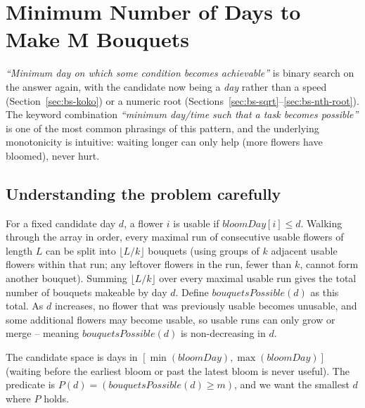 \section{Minimum Number of Days to Make M Bouquets}
\label{sec:bs-bouquets}


\begin{patternbox}
\emph{``Minimum day on which some condition becomes achievable''} is
binary search on the answer again, with the candidate now being a
\emph{day} rather than a speed (Section~\ref{sec:bs-koko}) or a numeric
root (Sections~\ref{sec:bs-sqrt}--\ref{sec:bs-nth-root}). The keyword
combination \emph{``minimum day/time such that a task becomes possible''}
is one of the most common phrasings of this pattern, and the underlying
monotonicity is intuitive: waiting longer can only help (more flowers have
bloomed), never hurt.
\end{patternbox}

\subsection*{Understanding the problem carefully}

For a fixed candidate day $d$, a flower $i$ is usable if
$\textit{bloomDay}[i] \le d$. Walking through the array in order, every
maximal run of consecutive usable flowers of length $L$ can be split into
$\lfloor L/k \rfloor$ bouquets (using groups of $k$ adjacent usable flowers
within that run; any leftover flowers in the run, fewer than $k$, cannot
form another bouquet). Summing $\lfloor L/k \rfloor$ over every maximal
usable run gives the total number of bouquets makeable by day $d$. Define
$\textit{bouquetsPossible}(d)$ as this total. As $d$ increases, no flower
that was previously usable becomes unusable, and some additional flowers
may become usable, so usable runs can only grow or merge -- meaning
$\textit{bouquetsPossible}(d)$ is non-decreasing in $d$.

\begin{ideabox}
The candidate space is days in $[\min(\textit{bloomDay}),
\max(\textit{bloomDay})]$ (waiting before the earliest bloom or past the
latest bloom is never useful). The predicate is
$P(d) = (\textit{bouquetsPossible}(d) \ge m)$, and we want the smallest
$d$ where $P$ holds.
\end{ideabox}


